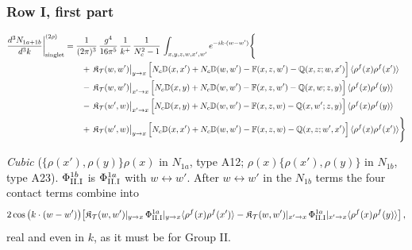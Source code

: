 \documentclass[9pt]{article}
\def\mf#1{\mathbb{#1}}
\numberwithin{equation}{section}
\begin{document}
{\subsubsection*{Row I, first part}

\begin{align}
\frac{d^{3}N_{1a+1b}}{d^{3}k}\bigg|^{(2\rho)}_{\rm singlet}&=\frac{1}{(2\pi)^{3}}\,\frac{g^{4}}{16\pi^{5}}\,\frac{1}{k^{+}}\,\frac{1}{N_{c}^{2}-1}\,\int_{x,y,z,w,x',w'}e^{-ik\cdot(w-w')}\Bigg\{\notag\\
&\qquad +\,\mathfrak{K}_{\mathcal{T}}(w,w')\big|_{y\to x}\,\Big[N_{c}\mf{D}(x,x')+N_{c}\mf{D}(w,w')-\mf{F}(x,z,w')-\mf{Q}(x,z;w,x')\Big]\,\langle\rho^{f}(x)\rho^{f}(x')\rangle\notag\\
&\qquad -\,\mathfrak{K}_{\mathcal{T}}(w,w')\big|_{x'\to x}\,\Big[N_{c}\mf{D}(x,y)+N_{c}\mf{D}(w,w')-\mf{F}(x,z,w')-\mf{Q}(x,w;z,y)\Big]\,\langle\rho^{f}(x)\rho^{f}(y)\rangle\notag\\
&\qquad -\,\mathfrak{K}_{\mathcal{T}}(w',w)\big|_{x'\to x}\,\Big[N_{c}\mf{D}(x,y)+N_{c}\mf{D}(w,w')-\mf{F}(x,z,w)-\mf{Q}(x,w';z,y)\Big]\,\langle\rho^{f}(x)\rho^{f}(y)\rangle\notag\\
&\qquad +\,\mathfrak{K}_{\mathcal{T}}(w',w)\big|_{y\to x}\,\Big[N_{c}\mf{D}(x,x')+N_{c}\mf{D}(w,w')-\mf{F}(x,z,w)-\mf{Q}(x,z;w',x')\Big]\,\langle\rho^{f}(x)\rho^{f}(x')\rangle\Bigg\}\label{eq:s-II-I-1}
\end{align}

\emph{Cubic} ($\{\rho(x'),\rho(y)\}\rho(x)$ in $N_{1a}$, type A12; $\rho(x)\{\rho(x'),\rho(y)\}$ in $N_{1b}$, type A23). $\Phi^{1b}_{\rm II.I}$ is $\Phi^{1a}_{\rm II.I}$ with $w\leftrightarrow w'$. After $w\leftrightarrow w'$ in the $N_{1b}$ terms the four contact terms combine into
\begin{align}
2\cos\big(k\cdot(w-w')\big)\big[\mathfrak{K}_{\mathcal{T}}(w,w')|_{y\to x}\,\Phi^{1a}_{\rm II.I}|_{y\to x}\langle\rho^{f}(x)\rho^{f}(x')\rangle-\mathfrak{K}_{\mathcal{T}}(w,w')|_{x'\to x}\,\Phi^{1a}_{\rm II.I}|_{x'\to x}\langle\rho^{f}(x)\rho^{f}(y)\rangle\big]\,,\notag
\end{align}
real and even in $k$, as it must be for Group II.

}
\end{document}
